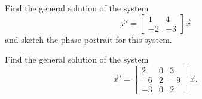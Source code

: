\documentclass{ximera}
\begin{document}
\begin{exercise}%
    Find the general solution of the system
    \begin{equation*}
        {\vec{x}}' = 
        \begin{bmatrix} 
            1 & 4 \\ 
            -2 & -3 
        \end{bmatrix} \vec{x}
    \end{equation*}
    and sketch the phase portrait for this system.
\end{exercise}

\begin{exercise}%
    Find the general solution of the system
    \begin{equation*}
        {\vec{x}}' = 
        \begin{bmatrix} 
            2 & 0 & 3 \\ 
            -6 & 2 & -9 \\ 
            -3 & 0 & 2 
        \end{bmatrix} \vec{x}.
    \end{equation*}
\end{exercise}
\end{document}
